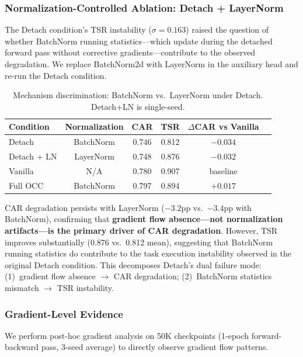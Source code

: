 \documentclass[10pt,letterpaper]{article}
\begin{document}
\subsubsection{Normalization-Controlled Ablation: Detach + LayerNorm}
\label{sec:detach_ln}

The Detach condition's TSR instability ($\sigma = 0.163$) raised the question of whether BatchNorm running statistics---which update during the detached forward pass without corrective gradients---contribute to the observed degradation. We replace BatchNorm2d with LayerNorm in the auxiliary head and re-run the Detach condition.

\begin{table}[t]
\centering
\caption{Mechanism discrimination: BatchNorm vs.\ LayerNorm under Detach. Detach+LN is single-seed.}
\label{tab:detach_ln}
\begin{tabular}{lccccc}
\toprule
Condition & Normalization & CAR & TSR & $\Delta$CAR vs Vanilla \\
\midrule
Detach           & BatchNorm & 0.746 & 0.812 & $-0.034$ \\
Detach + LN      & LayerNorm & 0.748 & 0.876 & $-0.032$ \\
Vanilla          & N/A       & 0.780 & 0.907 & baseline \\
Full OCC         & BatchNorm & 0.797 & 0.894 & $+0.017$ \\
\bottomrule
\end{tabular}
\end{table}

CAR degradation persists with LayerNorm ($-3.2$pp vs.\ $-3.4$pp with BatchNorm), confirming that \textbf{gradient flow absence---not normalization artifacts---is the primary driver of CAR degradation}. However, TSR improves substantially (0.876 vs.\ 0.812 mean), suggesting that BatchNorm running statistics do contribute to the task execution instability observed in the original Detach condition. This decomposes Detach's dual failure mode: (1)~gradient flow absence $\to$ CAR degradation; (2)~BatchNorm statistics mismatch $\to$ TSR instability.

\subsubsection{Gradient-Level Evidence}
\label{sec:grad}

We perform post-hoc gradient analysis on 50K checkpoints (1-epoch forward-backward pass, 3-seed average) to directly observe gradient flow patterns.
\end{document}

